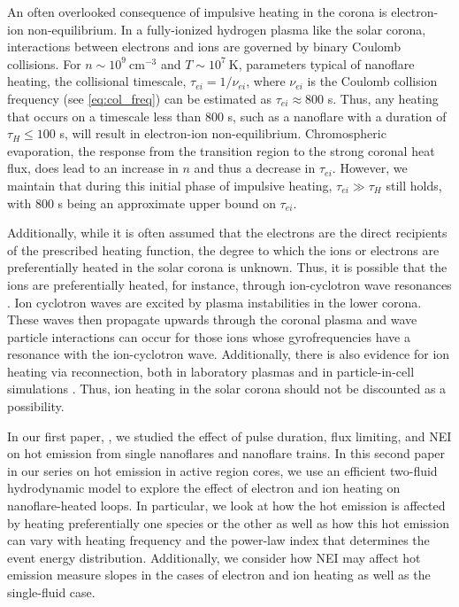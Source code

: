\documentclass[apj]{emulateapj}
\begin{document}
	\par An often overlooked consequence of impulsive heating in the corona is electron-ion non-equilibrium. In a fully-ionized hydrogen plasma like the solar corona, interactions between electrons and ions are governed by binary Coulomb collisions. For $n\sim10^9~\mathrm{cm}^{-3}$ and $T\sim10^7~\mathrm{K}$, parameters typical of nanoflare heating, the collisional timescale, $\tau_{ei}=1/\nu_{ei}$, where $\nu_{ei}$ is the Coulomb collision frequency (see \autoref{eq:col_freq}) can be estimated as $\tau_{ei}\approx800$ s. Thus, any heating that occurs on a timescale less than 800 s, such as a nanoflare with a duration of $\tau_H\le100$ s, will result in electron-ion non-equilibrium. Chromospheric evaporation, the response from the transition region to the strong coronal heat flux, does lead to an increase in $n$ and thus a decrease in $\tau_{ei}$. However, we maintain that during this initial phase of impulsive heating, $\tau_{ei}\gg\tau_H$ still holds, with 800 s being an approximate upper bound on $\tau_{ei}$. 
	\par Additionally, while it is often assumed that the electrons are the direct recipients of the prescribed heating function, the degree to which the ions or electrons are preferentially heated in the solar corona is unknown. Thus, it is possible that the ions are preferentially heated, for instance, through ion-cyclotron wave resonances \citep{markovskii_intermittent_2004}. Ion cyclotron waves are excited by plasma instabilities in the lower corona. These waves then propagate upwards through the coronal plasma and wave particle interactions can occur for those ions whose gyrofrequencies have a resonance with the ion-cyclotron wave. Additionally, there is also evidence for ion heating via reconnection, both in laboratory plasmas and in particle-in-cell simulations \citep{ono_ion_1996,yoo_bulk_2014,drake_onset_2014}. Thus, ion heating in the solar corona should not be discounted as a possibility.
	\par In our first paper, \citet{barnes_inference_2016} , we studied the effect of pulse duration, flux limiting, and NEI on hot emission from single nanoflares and nanoflare trains. In this second paper in our series on hot emission in active region cores, we use an efficient two-fluid hydrodynamic model to explore the effect of electron and ion heating on nanoflare-heated loops. In particular, we look at how the hot emission is affected by heating preferentially one species or the other as well as how this hot emission can vary with heating frequency and the power-law index that determines the event energy distribution. Additionally, we consider how NEI may affect hot emission measure slopes in the cases of electron and ion heating as well as the single-fluid case.
\end{document}
